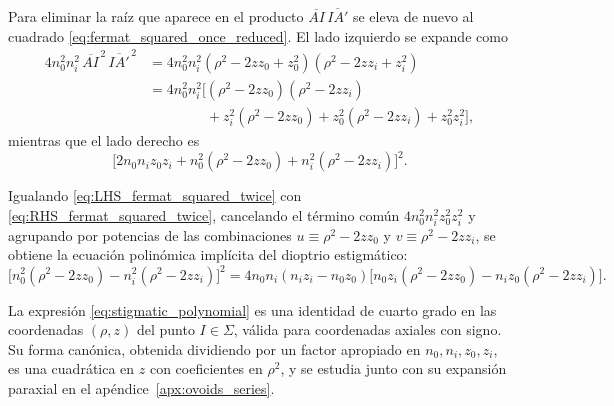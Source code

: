 Para eliminar la raíz que aparece en el producto $\overline{AI}\,\overline{IA'}$
se eleva de nuevo al cuadrado \eqref{eq:fermat_squared_once_reduced}. El lado
izquierdo se expande como
\begin{equation}
\begin{aligned}
4n_0^2n_i^2\,\overline{AI}^{\,2}\,\overline{IA'}^{\,2}
&=
4n_0^2n_i^2(\rho^2-2zz_0+z_0^2)(\rho^2-2zz_i+z_i^2)
\\
&=
4n_0^2n_i^2\bigl[(\rho^2-2zz_0)(\rho^2-2zz_i)
\\
&\phantom{=4n_0^2n_i^2\bigl[}
+z_i^2(\rho^2-2zz_0)
+z_0^2(\rho^2-2zz_i)
+z_0^2z_i^2\bigr],
\end{aligned}
\label{eq:LHS_fermat_squared_twice}
\end{equation}
mientras que el lado derecho es
\begin{equation}
\bigl[2n_0n_iz_0z_i+n_0^2(\rho^2-2zz_0)+n_i^2(\rho^2-2zz_i)\bigr]^2.
\label{eq:RHS_fermat_squared_twice}
\end{equation}

Igualando \eqref{eq:LHS_fermat_squared_twice} con
\eqref{eq:RHS_fermat_squared_twice}, cancelando el término común
$4n_0^2n_i^2z_0^2z_i^2$ y agrupando por potencias de las combinaciones
$u\equiv\rho^2-2zz_0$ y $v\equiv\rho^2-2zz_i$, se obtiene la ecuación
polinómica implícita del dioptrio estigmático:
\begin{equation}
\bigl[n_0^2(\rho^2-2zz_0)-n_i^2(\rho^2-2zz_i)\bigr]^2
=
4n_0n_i(n_iz_i-n_0z_0)
\bigl[n_0z_i(\rho^2-2zz_0)-n_iz_0(\rho^2-2zz_i)\bigr].
\label{eq:stigmatic_polynomial}
\end{equation}

La expresión \eqref{eq:stigmatic_polynomial} es una identidad de cuarto grado
en las coordenadas $(\rho,z)$ del punto $I\in\Sigma$, válida para
coordenadas axiales con signo. Su forma canónica, obtenida dividiendo por un
factor apropiado en $n_0,n_i,z_0,z_i$, es una cuadrática en $z$ con
coeficientes en $\rho^2$, y se estudia junto con su expansión paraxial en el
apéndice~\ref{apx:ovoids_series}.
